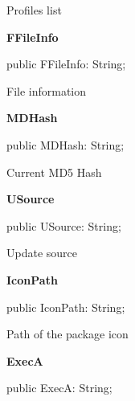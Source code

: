 \documentclass{report}
\newif\ifpdf
\begin{document}
\begin{list}{}
\begin{flushleft}
\ifpdf
\end{flushleft}
\fi


\par Profiles list\label{imainunit.TIWizFrm-FFileInfo}
\item[\textbf{FFileInfo}\hfill]
\ifpdf
\begin{flushleft}
\fi
\begin{ttfamily}
public FFileInfo: String;\end{ttfamily}

\ifpdf
\end{flushleft}
\fi


\par File information\label{imainunit.TIWizFrm-MDHash}
\item[\textbf{MDHash}\hfill]
\ifpdf
\begin{flushleft}
\fi
\begin{ttfamily}
public MDHash: String;\end{ttfamily}

\ifpdf
\end{flushleft}
\fi


\par Current MD5 Hash\label{imainunit.TIWizFrm-USource}
\item[\textbf{USource}\hfill]
\ifpdf
\begin{flushleft}
\fi
\begin{ttfamily}
public USource: String;\end{ttfamily}

\ifpdf
\end{flushleft}
\fi


\par Update source\label{imainunit.TIWizFrm-IconPath}
\item[\textbf{IconPath}\hfill]
\ifpdf
\begin{flushleft}
\fi
\begin{ttfamily}
public IconPath: String;\end{ttfamily}

\ifpdf
\end{flushleft}
\fi


\par Path of the package icon\label{imainunit.TIWizFrm-ExecA}
\item[\textbf{ExecA}\hfill]
\ifpdf
\begin{flushleft}
\fi
\begin{ttfamily}
public ExecA: String;\end{ttfamily}


\end{flushleft}
\end{list}
\end{document}
